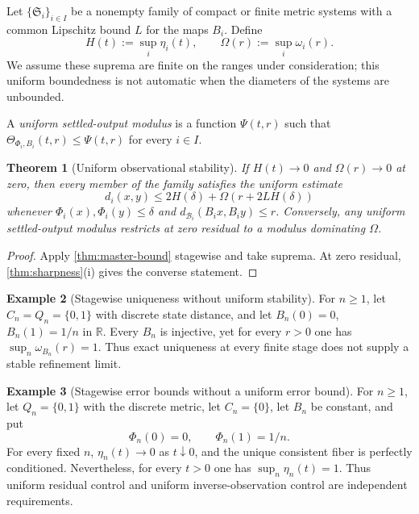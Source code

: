 \documentclass[11pt]{article}
\newtheorem{theorem}{Theorem}[section]
\theoremstyle{definition}
\newtheorem{example}[theorem]{Example}
\theoremstyle{remark}
\numberwithin{equation}{section}
\newcommand{\cB}{\mathcal B}
\begin{document}
Let $\{\mathfrak S_i\}_{i\in I}$ be a nonempty family of compact or finite metric systems with a common Lipschitz bound $L$ for the maps $B_i$.  Define
\[
 H(t):=\sup_i\eta_i(t),\qquad
 \Omega(r):=\sup_i\omega_i(r).
\]
We assume these suprema are finite on the ranges under consideration; this
uniform boundedness is not automatic when the diameters of the systems are
unbounded.

A \emph{uniform settled-output modulus} is a function
$\Psi(t,r)$ such that
$\Theta_{\Phi_i,B_i}(t,r)\le\Psi(t,r)$ for every $i\in I$.

\begin{theorem}[Uniform observational stability]\label{thm:uniform-family}
If $H(t)\to0$ and $\Omega(r)\to0$ at zero, then every member of the family satisfies the uniform estimate
\[
 d_i(x,y)\le
 2H(\delta)+\Omega(r+2LH(\delta))
\]
whenever $\Phi_i(x),\Phi_i(y)\le\delta$ and
$d_{\cB_i}(B_ix,B_iy)\le r$.  Conversely, any uniform settled-output modulus restricts at zero residual to a modulus dominating $\Omega$.
\end{theorem}

\begin{proof}
Apply \cref{thm:master-bound} stagewise and take suprema.  At zero residual, \cref{thm:sharpness}(i) gives the converse statement.
\end{proof}

\begin{example}[Stagewise uniqueness without uniform stability]\label{ex:nonuniform}
For $n\ge1$, let $C_n=Q_n=\{0,1\}$ with discrete state distance, and let $B_n(0)=0$, $B_n(1)=1/n$ in $\mathbb R$.  Every $B_n$ is injective, yet for every $r>0$ one has $\sup_n\omega_{B_n}(r)=1$.  Thus exact uniqueness at every finite stage does not supply a stable refinement limit.
\end{example}

\begin{example}[Stagewise error bounds without a uniform error bound]\label{ex:nonuniform-residual}
For $n\ge1$, let $Q_n=\{0,1\}$ with the discrete metric, let $C_n=\{0\}$, let $B_n$ be
constant, and put
\[
 \Phi_n(0)=0,\qquad \Phi_n(1)=1/n.
\]
For every fixed $n$, $\eta_n(t)\to0$ as $t\downarrow0$, and the unique
consistent fiber is perfectly conditioned.  Nevertheless, for every
$t>0$ one has $\sup_n\eta_n(t)=1$.  Thus uniform residual control and uniform
inverse-observation control are independent requirements.
\end{example}
\end{document}
